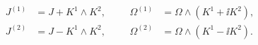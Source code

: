 \begin{equation}
\begin{aligned}
   J^{(1)} &= J + K^1 \wedge K^2 , &&& 
   \Omega^{(1)} &= \Omega \wedge (K^1 + \ii K^2) , \\
   J^{(2)} &= J - K^1 \wedge K^2 , &&&
   \Omega^{(2)} &= \Omega \wedge (K^1 - \ii K^2) . 
\end{aligned}
\end{equation}

